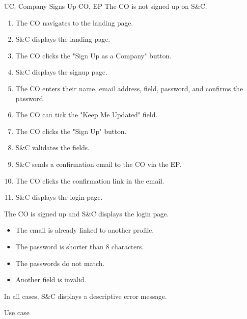 \clearpage
\begin{usecase}
    {UC\theuc. Company Signs Up}
    {CO, EP}
    {The CO is not signed up on S\&C.}
    {\begin{enumerate}[leftmargin=*]
        \item The CO navigates to the landing page.
        \item S\&C displays the landing page.
        \item The CO clicks the "Sign Up as a Company" button.
        \item S\&C displays the signup page.
        \item The CO enters their name, email address, field, password, and confirms the password.
        \item The CO can tick the "Keep Me Updated" field.
        \item The CO clicks the "Sign Up" button.
        \item S\&C validates the fields.
        \item S\&C sends a confirmation email to the CO via the EP.
        \item The CO clicks the confirmation link in the email.
        \item S\&C displays the login page.
    \end{enumerate}}
    {The CO is signed up and S\&C displays the login page.}
    {\begin{itemize}[leftmargin=*, label=\tiny\textbullet]
        \item The email is already linked to another profile.
        \item The password is shorter than 8 characters.
        \item The passwords do not match.
        \item Another field is invalid.
    \end{itemize}
    In all cases, S\&C displays a descriptive error message.}
    {Use case \theuc}
\end{usecase}


